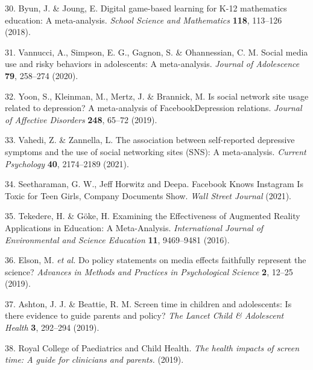 \documentclass[
  english,
  man]{apa6}
\newenvironment{cslreferences}%
  {}%
  {\par}
\begin{document}
\begin{cslreferences}
\leavevmode\hypertarget{ref-byunDigitalGamebasedLearning2018}{}%
30. Byun, J. \& Joung, E. Digital game-based learning for K-12 mathematics education: A meta-analysis. \emph{School Science and Mathematics} \textbf{118}, 113--126 (2018).

\leavevmode\hypertarget{ref-vannucciSocialMediaUse2020}{}%
31. Vannucci, A., Simpson, E. G., Gagnon, S. \& Ohannessian, C. M. Social media use and risky behaviors in adolescents: A meta-analysis. \emph{Journal of Adolescence} \textbf{79}, 258--274 (2020).

\leavevmode\hypertarget{ref-yoonSocialNetworkSite2019}{}%
32. Yoon, S., Kleinman, M., Mertz, J. \& Brannick, M. Is social network site usage related to depression? A meta-analysis of FacebookDepression relations. \emph{Journal of Affective Disorders} \textbf{248}, 65--72 (2019).

\leavevmode\hypertarget{ref-vahediAssociationSelfreportedDepressive2021}{}%
33. Vahedi, Z. \& Zannella, L. The association between self-reported depressive symptoms and the use of social networking sites (SNS): A meta-analysis. \emph{Current Psychology} \textbf{40}, 2174--2189 (2021).

\leavevmode\hypertarget{ref-seetharamanFacebookKnowsInstagram2021}{}%
34. Seetharaman, G. W., Jeff Horwitz and Deepa. Facebook Knows Instagram Is Toxic for Teen Girls, Company Documents Show. \emph{Wall Street Journal} (2021).

\leavevmode\hypertarget{ref-tekedereExaminingEffectivenessAugmented2016}{}%
35. Tekedere, H. \& Göke, H. Examining the Effectiveness of Augmented Reality Applications in Education: A Meta-Analysis. \emph{International Journal of Environmental and Science Education} \textbf{11}, 9469--9481 (2016).

\leavevmode\hypertarget{ref-elsonPolicyStatementsMedia2019}{}%
36. Elson, M. \emph{et al.} Do policy statements on media effects faithfully represent the science? \emph{Advances in Methods and Practices in Psychological Science} \textbf{2}, 12--25 (2019).

\leavevmode\hypertarget{ref-ashtonScreenTimeChildren2019}{}%
37. Ashton, J. J. \& Beattie, R. M. Screen time in children and adolescents: Is there evidence to guide parents and policy? \emph{The Lancet Child \& Adolescent Health} \textbf{3}, 292--294 (2019).

\leavevmode\hypertarget{ref-royalcollegeofpaediatricsandchildhealthHealthImpactsScreen2019}{}%
38. Royal College of Paediatrics and Child Health. \emph{The health impacts of screen time: A guide for clinicians and parents.} (2019).


\end{cslreferences}
\end{document}
